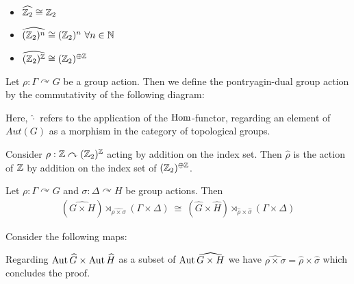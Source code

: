 \begin{Example}
	\label{the_zero_divisor_problem:pontryagin_duality:example_duals}
	\
	\begin{itemize}
		\item {$\widehat{\mathbb{Z}_2} \cong \mathbb{Z}_2$}
		\item {$\widehat{(\mathbb{Z}_2)^n} \cong (\mathbb{Z}_2)^n ~\forall n \in \mathbb{N}$}
		\item {$\widehat{(\mathbb{Z}_2)^{\mathbb{Z}}} \cong (\mathbb{Z}_2)^{\oplus \mathbb{Z}}$}
	\end{itemize}
\end{Example}

\begin{Definition}
	Let $\rho: \Gamma \curvearrowright G$ be a group action.
	Then we define the {pontryagin-dual group action} by the commutativity of the following diagram:
	\begin{figure}[H]
		\centering
		
	\end{figure}
	Here, $\widehat{\cdot}$ refers to the application of the $\operatorname{Hom}$-functor, regarding an element of $Aut(G)$ as a morphism in the category of topological groups.
\end{Definition}

\begin{Example}
	\label{the_zero_divisor_problem:pontryagin_duality:example_dual_action}
	Consider $\rho: \mathbb{Z} \curvearrowright (\mathbb{Z}_2)^{\mathbb{Z}}$ acting by addition on the index set.
	Then $\widehat{\rho}$ is the action of $\mathbb{Z}$ by addition on the index set of $(\mathbb{Z}_2)^{\oplus \mathbb{Z}}$.
\end{Example}

\begin{Lemma}
	\label{the_zero_divisor_problem:pontryagin_duality:lemma_product_of_dual_group_actions}
	Let $\rho: \Gamma \curvearrowright G$ and $\sigma: \Delta \curvearrowright H$ be group actions. Then
	\begin{align*}
		(\widehat{G \times H}) \rtimes_{\widehat{\rho \times \sigma}} (\Gamma \times \Delta) ~\cong~ (\widehat{G} \times \widehat{H}) \rtimes_{\widehat{\rho} \times \widehat{\sigma}} (\Gamma \times \Delta)
	\end{align*}
\end{Lemma}

\proof
	Consider the following maps:
	\begin{figure}[H]
		\centering
		
	\end{figure}
	Regarding $\operatorname{Aut}{\widehat{G}} \times \operatorname{Aut}{\widehat{H}}$ as a subset of $\operatorname{Aut} \widehat{G \times H}$ we have $\widehat{\rho \times \sigma} = \widehat{\rho} \times \widehat{\sigma}$ which concludes the proof.
\endproof

